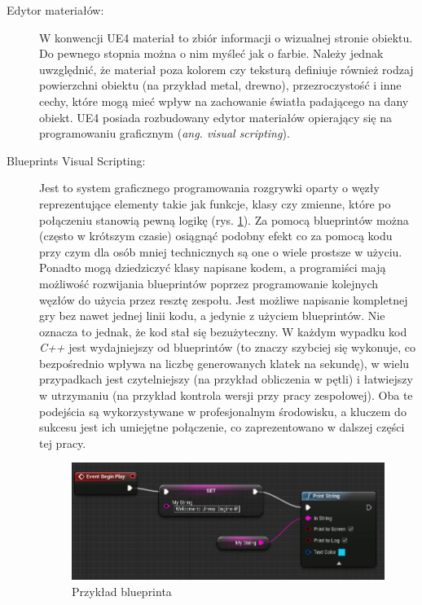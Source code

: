 \documentclass[multip]{SGGW-thesis}
\begin{document}
\begin{description}
\item[Edytor materiałów:]W konwencji UE4 materiał to zbiór informacji o wizualnej stronie obiektu. Do pewnego stopnia można o nim myśleć jak o farbie. Należy jednak uwzględnić, że materiał poza kolorem czy teksturą definiuje również rodzaj powierzchni obiektu (na przykład metal, drewno), przezroczystość i inne cechy, które mogą mieć wpływ na zachowanie światła padającego na dany obiekt. UE4 posiada rozbudowany edytor materiałów opierający się na programowaniu graficznym ({\em ang. visual scripting}).
\item[Blueprints Visual Scripting:]Jest to system graficznego programowania rozgrywki oparty o węzły reprezentujące elementy takie jak funkcje, klasy czy zmienne, które po połączeniu stanowią pewną logikę (rys. \ref{fig-bp-example}). Za pomocą blueprintów można (często w krótszym czasie) osiągnąć podobny efekt co za pomocą kodu przy czym dla osób mniej technicznych są one o wiele prostsze w użyciu. Ponadto mogą dziedziczyć klasy napisane kodem, a programiści mają możliwość rozwijania blueprintów poprzez programowanie kolejnych węzłów do użycia przez resztę zespołu. Jest możliwe napisanie kompletnej gry bez nawet jednej linii kodu, a jedynie z użyciem blueprintów. Nie oznacza to jednak, że kod stał się bezużyteczny. W każdym wypadku kod {\em C++} jest wydajniejszy od blueprintów (to znaczy szybciej się wykonuje, co bezpośrednio wpływa na liczbę generowanych klatek na sekundę), w wielu przypadkach jest czytelniejszy (na przykład obliczenia w pętli) i łatwiejszy w utrzymaniu (na przykład kontrola wersji przy pracy zespołowej).\cite{docs-blueprints}
\newline Oba te podejścia są wykorzystywane w profesjonalnym środowisku, a kluczem do sukcesu jest ich umiejętne połączenie, co zaprezentowano w dalszej części tej pracy.
\begin{figure}
	\centering
		\includegraphics[width=1\textwidth]{figures/bp_example.jpg}
	\caption{Przykład blueprinta}
	\label{fig-bp-example}
\end{figure}

\end{description}
\end{document}
